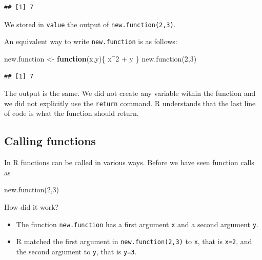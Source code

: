 \documentclass[
]{book}
\newenvironment{Shaded}{\begin{snugshade}}{\end{snugshade}}
\newcommand{\ControlFlowTok}[1]{\textcolor[rgb]{0.13,0.29,0.53}{\textbf{#1}}}
\newcommand{\DecValTok}[1]{\textcolor[rgb]{0.00,0.00,0.81}{#1}}
\newcommand{\FunctionTok}[1]{\textcolor[rgb]{0.00,0.00,0.00}{#1}}
\newcommand{\NormalTok}[1]{#1}
\newcommand{\OtherTok}[1]{\textcolor[rgb]{0.56,0.35,0.01}{#1}}
\newcommand{\SpecialCharTok}[1]{\textcolor[rgb]{0.00,0.00,0.00}{#1}}
\begin{document}
\begin{verbatim}
## [1] 7
\end{verbatim}

We stored in \texttt{value} the output of \texttt{new.function(2,3)}.

An equivalent way to write \texttt{new.function} is as follows:

\begin{Shaded}
\begin{Highlighting}[]
\NormalTok{new.function }\OtherTok{\textless{}{-}} \ControlFlowTok{function}\NormalTok{(x,y)\{}
\NormalTok{  x}\SpecialCharTok{\^{}}\DecValTok{2} \SpecialCharTok{+}\NormalTok{ y}
\NormalTok{\}}
\FunctionTok{new.function}\NormalTok{(}\DecValTok{2}\NormalTok{,}\DecValTok{3}\NormalTok{)}
\end{Highlighting}
\end{Shaded}

\begin{verbatim}
## [1] 7
\end{verbatim}

The output is the same. We did not create any variable within the function and we did not explicitly use the \texttt{return} command. R understands that the last line of code is what the function should return.

\hypertarget{calling-functions}{%
\subsection{Calling functions}\label{calling-functions}}

In R functions can be called in various ways. Before we have seen function calls as

\begin{Shaded}
\begin{Highlighting}[]
\FunctionTok{new.function}\NormalTok{(}\DecValTok{2}\NormalTok{,}\DecValTok{3}\NormalTok{)}
\end{Highlighting}
\end{Shaded}

How did it work?

\begin{itemize}
\item
  The function \texttt{new.function} has a first argument \texttt{x} and a second argument \texttt{y}.
\item
  R matched the first argument in \texttt{new.function(2,3)} to \texttt{x}, that is \texttt{x=2}, and the second argument to \texttt{y}, that is \texttt{y=3}.
\end{itemize}
\end{document}
